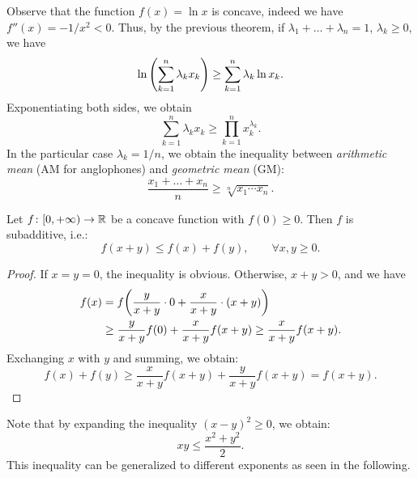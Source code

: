\begin{example}
\label{ex:AMGM}%
  \mymark{*}%
%
Observe that the function $f(x) = \ln x$ is concave, indeed we have
$f''(x) = -1/x^2 < 0$. Thus, by the previous theorem, if $\lambda_1 + \dots +
\lambda_n =1$, $\lambda_k \ge 0$, we have
\[
    \ln{\left( \sum_{k=1}^n \lambda_k x_k \right)}
    \ge \sum_{k=1}^n \lambda_k \ln x_k.
\]
Exponentiating both sides, we obtain
\[
  \sum_{k=1}^n \lambda_k x_k \ge \prod_{k=1}^n x_k^{\lambda_k}.
\]
In the particular case $\lambda_k = 1/n$, we obtain
the inequality between \emph{arithmetic mean} (AM for anglophones)
and \emph{geometric mean}
%
%
%
%
%
%
(GM):
\[
  \frac{x_1 + \dots + x_n}{n} \ge \sqrt[n]{x_1\cdots x_n}.
\]
\end{example}

\begin{exercise}
%
%
%
Let $f\colon [0,+\infty) \to {\mathbb R}$ be a concave function with $f(0)\ge 0$. Then
$f$ is subadditive, i.e.:
\[
  f(x+y) \le f(x) + f(y),\qquad \forall x,y\ge 0.
\]
\end{exercise}
%
\begin{proof}
If $x=y=0$, the inequality is obvious.
Otherwise, $x+y>0$, and we have
\begin{align*}
f(x) &= f{\left( \frac{y}{x+y}\cdot 0 + \frac{x}{x+y}\cdot (x+y) \right)}\\ &\ge
\frac{y}{x+y}f(0) + \frac{x}{x+y}f(x+y)
\ge \frac{x}{x+y}f(x+y).
\end{align*}
Exchanging $x$ with $y$ and summing, we obtain:
\[
  f(x) + f(y) \ge \frac{x}{x+y}f(x+y) + \frac{y}{x+y}f(x+y) = f(x+y).
\]
\end{proof}

Note that by expanding the inequality $(x-y)^2\ge 0$, we obtain:
\[
  x y \le \frac{x^2 + y^2}{2}.
\]
This inequality can be generalized to different exponents 
as seen in the following.

